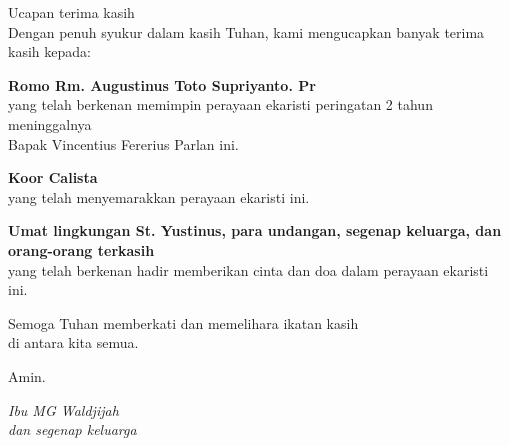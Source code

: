 \documentclass[titlepage,10pt,openany]{scrbook}
\newcommand{\namaalm}{Bapak Vincentius Fererius Parlan }
\newcommand{\namaromo}{Rm. Augustinus Toto Supriyanto. Pr}
\begin{document}
\newpage
\begin{flushright}
{\Large Ucapan terima kasih}\\
\noindent Dengan penuh syukur dalam kasih Tuhan, kami mengucapkan banyak
terima kasih kepada:
\large

\textbf{Romo \namaromo}\\
yang telah berkenan memimpin perayaan ekaristi peringatan 2 tahun meninggalnya\\ \namaalm
ini.

\textbf{Koor Calista}\\
yang telah menyemarakkan perayaan ekaristi ini.

\textbf{Umat lingkungan St. Yustinus, para undangan, segenap keluarga, dan orang-orang terkasih}\\
yang telah berkenan hadir memberikan cinta dan doa dalam perayaan
ekaristi ini.

Semoga Tuhan memberkati dan memelihara ikatan kasih\\ di antara kita semua.

Amin.

\bigskip 

\textit{Ibu MG Waldjijah\\
dan segenap keluarga}
\end{flushright}
\end{document}
